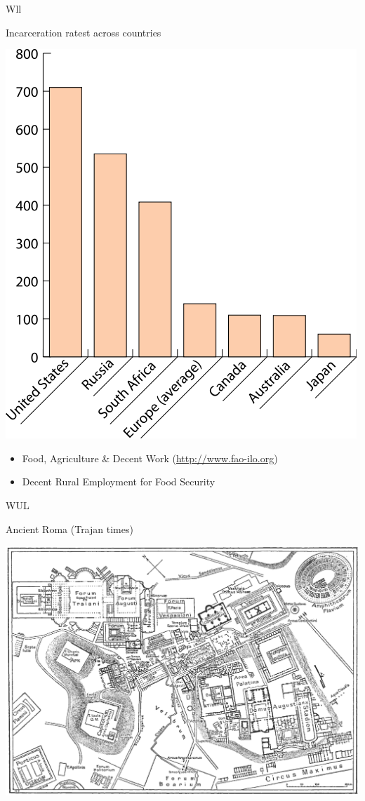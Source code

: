 \begin{map}{W}{ll}
\caption{Incarceration ratest across countries}
\label{chart:incarceration}
\includegraphics[width=\chartwidth,height=\chartheight]{incarceration}  
\end{map}

\lipsum[1]

\begin{freading}
  \begin{itemize}
  \item Food, Agriculture \& Decent Work (\url{http://www.fao-ilo.org})
  \item Decent Rural Employment for  Food Security 
  \end{itemize}
\end{freading}

\begin{map}{W}{UL}
\caption{Ancient Roma  (Trajan times)}
\label{map:roma}
\includegraphics[width=\chartwidth,height=\chartheight]{Rome}
\end{map}

